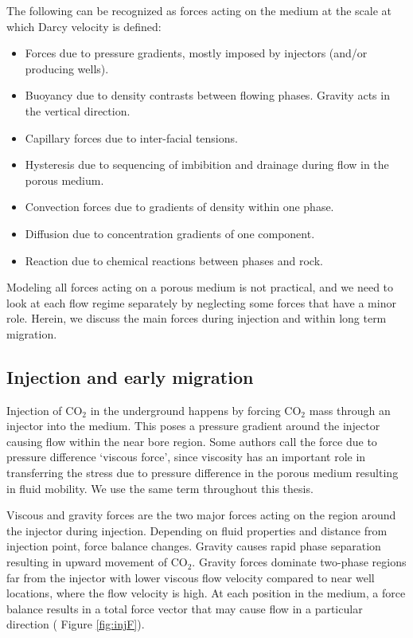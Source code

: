 The following can be recognized as forces acting on the medium at the scale at
which Darcy velocity is defined:

\begin{itemize}
\item Forces due to pressure gradients, mostly imposed by injectors (and/or
producing wells).
\item Buoyancy due to density contrasts between flowing phases. Gravity acts in the vertical direction.
\item Capillary forces due to inter-facial tensions.
\item Hysteresis due to sequencing of imbibition and drainage during flow in
the porous medium.
\item Convection forces due to gradients of density within one phase.
\item Diffusion due to concentration gradients of one component.
\item Reaction due to chemical reactions between phases and rock.
\end{itemize}

Modeling all forces acting on a porous medium is not practical, and we need to look at each flow regime separately by neglecting some forces that have a minor role. Herein, we discuss the main forces during injection and within long term migration.


\subsection{Injection and early migration}

Injection of $\mbox{CO}_2$ in the underground happens by forcing $\mbox{CO}_2$
mass through an injector into the medium. This poses a pressure gradient around the injector causing flow within the near bore region. Some authors call the force due to pressure difference `viscous force', since viscosity has an important role in transferring the stress due to pressure difference in the porous medium resulting in fluid mobility. We use the same term throughout this thesis. 

Viscous and gravity forces are the two major forces acting on the region around the injector during injection. Depending on fluid properties and distance from injection point, force balance changes. Gravity causes rapid phase
separation resulting in upward movement of $\mbox{CO}_2$. Gravity forces
dominate two-phase regions far from the injector with lower viscous flow velocity compared to near well locations, where the flow velocity is high. At each position in the medium, a force balance results in a total force vector that may cause flow in a particular direction ( Figure \ref{fig:injF}).

